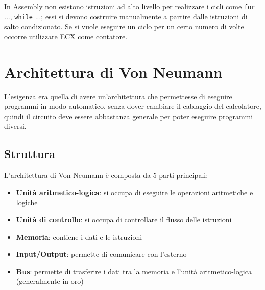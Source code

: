 \documentclass[a4paper]{article}
\theoremstyle{break}
\theoremstyle{break}
\theoremstyle{break}
\theoremstyle{break}
\begin{document}
\noindent In Assembly non esistono istruzioni ad alto livello per realizzare i cicli come \texttt{for} ...,
\texttt{while} ...; essi si devono costruire manualmente a partire dalle istruzioni di salto
condizionato. Se si vuole eseguire un ciclo per un certo numero di volte occorre utilizzare
ECX come contatore.


\section{Architettura di Von Neumann}
L'esigenza era quella di avere un'architettura che permettesse di eseguire programmi
in modo automatico, senza dover cambiare il cablaggio del calcolatore, quindi il circuito
deve essere abbastanza generale per poter eseguire programmi diversi.

\subsection{Struttura}
L'architettura di Von Neumann è composta da 5 parti principali:
\begin{itemize}
	\item \textbf{Unità aritmetico-logica}: si occupa di eseguire le operazioni aritmetiche e logiche
	\item \textbf{Unità di controllo}: si occupa di controllare il flusso delle istruzioni
	\item \textbf{Memoria}: contiene i dati e le istruzioni
	\item \textbf{Input/Output}: permette di comunicare con l'esterno
	\item \textbf{Bus}: permette di trasferire i dati tra la memoria e l'unità aritmetico-logica (generalmente in oro)
\end{itemize}

\begin{figure}[H]
	\centering
\end{figure}
\end{document}
